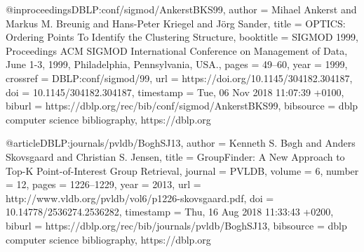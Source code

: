 @inproceedings{DBLP:conf/sigmod/AnkerstBKS99,
  author    = {Mihael Ankerst and
               Markus M. Breunig and
               Hans{-}Peter Kriegel and
               J{\"{o}}rg Sander},
  title     = {{OPTICS:} Ordering Points To Identify the Clustering Structure},
  booktitle = {{SIGMOD} 1999, Proceedings {ACM} {SIGMOD} International Conference
               on Management of Data, June 1-3, 1999, Philadelphia, Pennsylvania,
               {USA.}},
  pages     = {49--60},
  year      = {1999},
  crossref  = {DBLP:conf/sigmod/99},
  url       = {https://doi.org/10.1145/304182.304187},
  doi       = {10.1145/304182.304187},
  timestamp = {Tue, 06 Nov 2018 11:07:39 +0100},
  biburl    = {https://dblp.org/rec/bib/conf/sigmod/AnkerstBKS99},
  bibsource = {dblp computer science bibliography, https://dblp.org}
}

@article{DBLP:journals/pvldb/BoghSJ13,
  author    = {Kenneth S. B{\o}gh and
               Anders Skovsgaard and
               Christian S. Jensen},
  title     = {GroupFinder: {A} New Approach to Top-K Point-of-Interest Group Retrieval},
  journal   = {{PVLDB}},
  volume    = {6},
  number    = {12},
  pages     = {1226--1229},
  year      = {2013},
  url       = {http://www.vldb.org/pvldb/vol6/p1226-skovsgaard.pdf},
  doi       = {10.14778/2536274.2536282},
  timestamp = {Thu, 16 Aug 2018 11:33:43 +0200},
  biburl    = {https://dblp.org/rec/bib/journals/pvldb/BoghSJ13},
  bibsource = {dblp computer science bibliography, https://dblp.org}
}